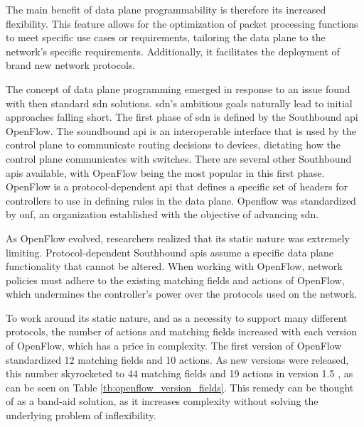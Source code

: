 The main benefit of data plane programmability is therefore its increased flexibility\cite{bifulco_survey_2018}. This feature allows for the optimization of packet processing functions to meet specific use cases or requirements, tailoring the data plane to the network's specific requirements. Additionally, it facilitates the deployment of brand new network protocols. 

The concept of data plane programming emerged in response to an issue found with then standard \gls{sdn} solutions. \gls{sdn}'s ambitious goals naturally lead to initial approaches falling short. The first phase of \gls{sdn} is defined by the Southbound \gls{api} OpenFlow. The soundbound \gls{api} is an interoperable interface that is used by the control plane to communicate routing decisions to devices, dictating how the control plane communicates with switches\cite{li_protocol_2017}. There are several other Southbound \glspl{api} available, with OpenFlow being the most popular in this first phase. OpenFlow is a protocol-dependent \gls{api} that defines a specific set of headers for controllers to use in defining rules in the data plane. Openflow was standardized by \gls{onf}, an organization established with the objective of advancing \gls{sdn}.

As OpenFlow evolved, researchers realized that its static nature was extremely limiting\cite{bosshart_p4_2014}\cite{hauser_survey_2021}\cite{li_protocol_2017}. Protocol-dependent Southbound \glspl{api} assume a specific data plane functionality that cannot be altered. When working with OpenFlow, network policies must adhere to the existing matching fields and actions of OpenFlow, which undermines the controller's power over the protocols used on the network.  

To work around its static nature, and as a necessity to support many different protocols, the number of actions and matching fields increased with each version of OpenFlow, which has a price in complexity. The first version of OpenFlow standardized 12 matching fields and 10 actions. As new versions were released, this number skyrocketed to 44 matching fields and 19 actions in version 1.5 \cite{li_protocol_2017}\cite{bosshart_p4_2014}, as can be seen on Table \ref{tb:openflow_version_fields}. This remedy can be thought of as a band-aid solution, as it increases complexity without solving the underlying problem of inflexibility.


